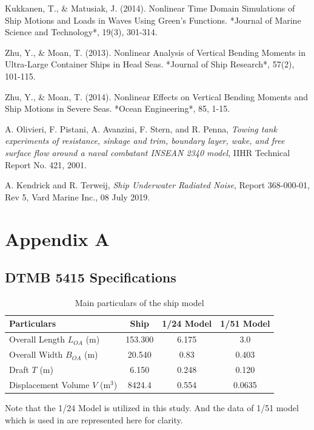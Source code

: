 \documentclass[12pt]{article} %
\begin{document}
\begin{thebibliography}{99}
     Kukkanen, T., \& Matusiak, J. (2014). Nonlinear Time Domain Simulations of Ship Motions and Loads in Waves Using Green's Functions. *Journal of Marine Science and Technology*, 19(3), 301-314.

     Zhu, Y., \& Moan, T. (2013). Nonlinear Analysis of Vertical Bending Moments in Ultra-Large Container Ships in Head Seas. *Journal of Ship Research*, 57(2), 101-115.

     Zhu, Y., \& Moan, T. (2014). Nonlinear Effects on Vertical Bending Moments and Ship Motions in Severe Seas. *Ocean Engineering*, 85, 1-15.

    A. Olivieri, F. Pistani, A. Avanzini, F. Stern, and R. Penna, \emph{Towing tank experiments of resistance, sinkage and trim, boundary layer, wake, and free surface flow around a naval combatant INSEAN 2340 model}, IIHR Technical Report No. 421, 2001.
    
    A. Kendrick and R. Terweij, \emph{Ship Underwater Radiated Noise}, Report 368-000-01, Rev 5, Vard Marine Inc., 08 July 2019.   
    
    
\end{thebibliography}

\section*{Appendix A}
\subsection*{DTMB 5415 Specifications}
\begin{table}[h!]
    \centering
    \begin{tabular}{|l|c|c|c|}
        \hline
        \textbf{Particulars} & \textbf{Ship} & \textbf{1/24 Model} &\textbf{1/51 Model} \\ \hline
        Overall Length $L_{OA}$ (m) & 153.300 &6.175& 3.0 \\ \hline
        Overall Width $B_{OA}$ (m) & 20.540 &0.83& 0.403 \\ \hline
        Draft $T$ (m) & 6.150 &0.248& 0.120 \\ \hline
        Displacement Volume $V$ (m$^3$) & 8424.4 &0.554& 0.0635 \\ \hline
        \end{tabular}
    \caption{Main particulars of the ship model}
\end{table}
Note that the 1/24 Model is utilized in this study. And the data of 1/51 model which is used in 
\cite{Begovic2017} are represented here for clarity.
\end{document}
